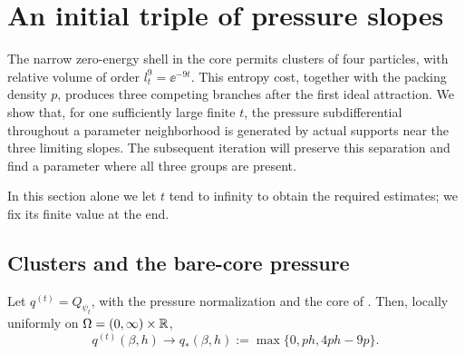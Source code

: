 \section{An initial triple of pressure slopes}
\label{i:section}

The narrow zero-energy shell in the core permits clusters of four particles,
with relative volume of order \(l_t^9=\ee^{-9t}\).  This entropy cost,
together with the packing density \(p\), produces three competing branches
after the first ideal attraction.  We show that, for one sufficiently large
finite \(t\), the pressure subdifferential throughout a parameter neighborhood
is generated by actual supports near the three limiting slopes.  The
subsequent iteration will preserve this separation and find a parameter
where all three groups are present.

In this section alone we let \(t\) tend to infinity to obtain the required
estimates; we fix its finite value at the end.

\subsection{Clusters and the bare-core pressure}

\begin{proposition}
\label{i:bare-pressure}
Let \(q^{(t)}=Q_{\psi_t}\), with the pressure normalization and the core
of .  Then, locally uniformly on
\(\Omega=(0,\infty)\times\mathbb R\),
\begin{equation}
 q^{(t)}(\beta,h)\longrightarrow
 q_*(\beta,h):=\max\{0,ph,4ph-9p\}.
 \label{i:bare-limit}
\end{equation}
\end{proposition}

